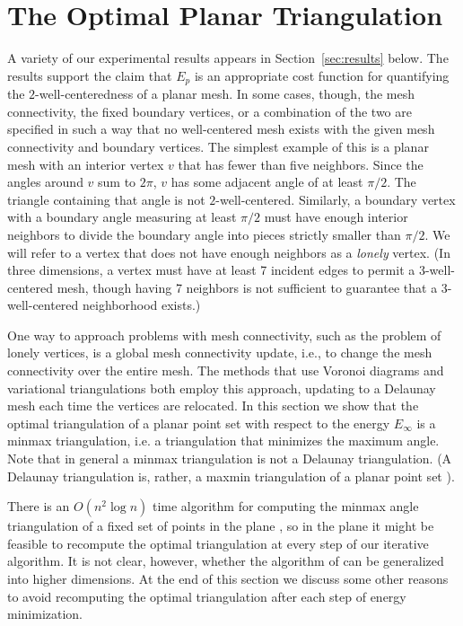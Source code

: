 \documentclass[final]{siamltex}
\begin{document}
\section{The Optimal Planar Triangulation}
\label{sec:globaltop}

A variety of our experimental results appears in
Section~\ref{sec:results} below.  The results support the claim that
$E_{p}$ is an appropriate cost function for quantifying the
$2$-well-centeredness of a planar mesh.  In some cases, though, the
mesh connectivity, the fixed boundary vertices, or a combination of
the two are specified in such a way that no well-centered mesh exists
with the given mesh connectivity and boundary vertices.  The simplest
example of this is a planar mesh with an interior vertex $v$ that has
fewer than five neighbors.  Since the angles around $v$ sum to $2\pi$,
$v$ has some adjacent angle of at least $\pi/2$.  The triangle
containing that angle is not $2$-well-centered.  Similarly, a boundary
vertex with a boundary angle measuring at least $\pi/2$ must have
enough interior neighbors to divide the boundary angle into pieces
strictly smaller than $\pi/2$.  We will refer to a vertex that does
not have enough neighbors as a \emph{lonely} vertex.  (In three
dimensions, a vertex must have at least 7 incident edges to permit
a 3-well-centered mesh, though having 7 neighbors is not sufficient to
guarantee that a 3-well-centered neighborhood exists.)

One way to approach problems with mesh connectivity, such as the
problem of lonely vertices, is a global mesh connectivity update,
i.e., to change the mesh connectivity over the entire mesh.  The
methods that use Voronoi diagrams \citep{DuFaGu1999} and variational
triangulations \cite{AlCoYvDe2005} both employ this approach, updating
to a Delaunay mesh each time the vertices are relocated.  In this
section we show that the optimal triangulation of a planar point set
with respect to the energy $E_{\infty}$ is a minmax triangulation,
i.e. a triangulation that minimizes the maximum angle.  Note that in
general a minmax triangulation is not a Delaunay triangulation.  (A
Delaunay triangulation is, rather, a maxmin triangulation of a planar
point set \cite{Sibson1978}).

There is an $O(n^2 \log n)$ time algorithm for computing the minmax
angle triangulation of a fixed set of points in the plane
\cite{EdTaWa1992}, so in the plane it might be feasible to
recompute the optimal triangulation at every step of our iterative
algorithm.  It is not clear, however, whether the algorithm of
\cite{EdTaWa1992} can be generalized into higher dimensions.
At the end of this section we discuss some other reasons to avoid
recomputing the optimal triangulation after each step of
energy minimization.
\end{document}
